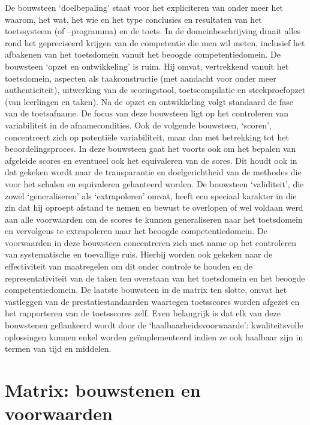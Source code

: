 \documentclass[
  letterpaper,
]{report}
\begin{document}
De bouwsteen `doelbepaling' staat voor het expliciteren van onder meer
het waarom, het wat, het wie en het type conclusies en resultaten van
het toetssysteem (of --programma) en de toets. In de domeinbeschrijving
draait alles rond het gepreciseerd krijgen van de competentie die men
wil meten, inclusief het afbakenen van het toetsdomein vanuit het
beoogde competentiedomein. De bouwsteen `opzet en ontwikkeling' is ruim.
Hij omvat, vertrekkend vanuit het toetsdomein, aspecten als
taakconstructie (met aandacht voor onder meer authenticiteit),
uitwerking van de scoringstool, toetscompilatie en steekproefopzet (van
leerlingen en taken). Na de opzet en ontwikkeling volgt standaard de
fase van de toetsafname. De focus van deze bouwsteen ligt op het
controleren van variabiliteit in de afnamecondities. Ook de volgende
bouwsteen, `scoren', concentreert zich op potentiële variabiliteit, maar
dan met betrekking tot het beoordelingsproces. In deze bouwsteen gaat
het voorts ook om het bepalen van afgeleide scores en eventueel ook het
equivaleren van de sores. Dit houdt ook in dat gekeken wordt naar de
transparantie en doelgerichtheid van de methodes die voor het schalen en
equivaleren gehanteerd worden. De bouwsteen `validiteit', die zowel
`generaliseren' als `extrapoleren' omvat, heeft een speciaal karakter in
die zin dat hij oproept afstand te nemen en bewust te overlopen of wel
voldaan werd aan alle voorwaarden om de scores te kunnen generaliseren
naar het toetsdomein en vervolgens te extrapoleren naar het beoogde
competentiedomein. De voorwaarden in deze bouwsteen concentreren zich
met name op het controleren van systematische en toevallige ruis.
Hierbij worden ook gekeken naar de effectiviteit van maatregelen om dit
onder controle te houden en de representativiteit van de taken ten
overstaan van het toetsdomein en het beoogde competentiedomein. De
laatste bouwsteen in de matrix ten slotte, omvat het vastleggen van de
prestatiestandaarden waartegen toetsscores worden afgezet en het
rapporteren van de toetsscores zelf. Even belangrijk is dat elk van deze
bouwstenen geflankeerd wordt door de `haalbaarheidsvoorwaarde':
kwaliteitsvolle oplossingen kunnen enkel worden geïmplementeerd indien
ze ook haalbaar zijn in termen van tijd en middelen.

\hypertarget{matrix-bouwstenen-en-voorwaarden}{%
\section{Matrix: bouwstenen en
voorwaarden}\label{matrix-bouwstenen-en-voorwaarden}}
\end{document}
